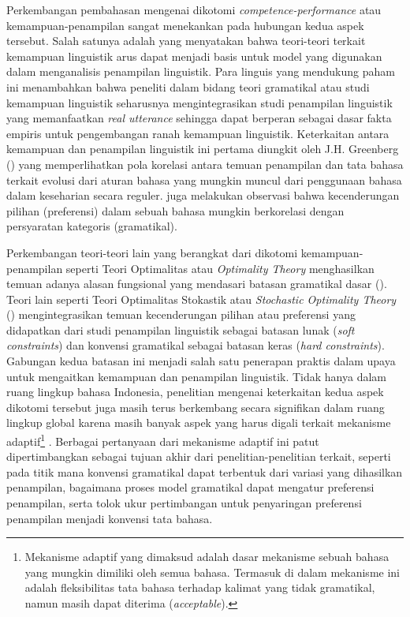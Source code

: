 Perkembangan pembahasan mengenai dikotomi \textit{competence-performance} atau kemampuan-penampilan sangat menekankan pada hubungan kedua aspek tersebut. Salah satunya adalah \cite{sagwasow2011pccg} yang menyatakan bahwa teori-teori terkait kemampuan linguistik arus dapat menjadi basis untuk model yang digunakan dalam menganalisis penampilan linguistik. Para linguis yang mendukung paham ini menambahkan bahwa peneliti dalam bidang teori gramatikal atau studi kemampuan linguistik seharusnya mengintegrasikan studi penampilan linguistik yang memanfaatkan \textit{real utterance} sehingga dapat berperan sebagai dasar fakta empiris untuk pengembangan ranah kemampuan linguistik. Keterkaitan antara kemampuan dan penampilan linguistik ini pertama diungkit oleh J.H. Greenberg (\citealp{greenberg1963some, greenberg1966language}) yang memperlihatkan pola korelasi antara temuan penampilan dan tata bahasa terkait evolusi dari aturan bahasa yang mungkin muncul dari penggunaan bahasa dalam keseharian secara reguler. \cite{givon1979syntax} juga melakukan observasi bahwa kecenderungan pilihan (preferensi) dalam sebuah bahasa mungkin berkorelasi dengan persyaratan kategoris (gramatikal). 

Perkembangan teori-teori lain yang berangkat dari dikotomi kemampuan-penampilan seperti Teori Optimalitas atau \textit{Optimality Theory} menghasilkan temuan adanya alasan fungsional yang mendasari batasan gramatikal dasar (\citealp{haspelmath1999optimality, aissen1999markedness}). Teori lain seperti Teori Optimalitas Stokastik atau \textit{Stochastic Optimality Theory} (\citealp{bresnan2001soft, manning2003probabilistic}) mengintegrasikan temuan kecenderungan pilihan atau preferensi yang didapatkan dari studi penampilan linguistik  sebagai batasan lunak (\textit{soft constraints}) dan konvensi gramatikal sebagai batasan keras (\textit{hard constraints}).  Gabungan kedua batasan ini menjadi salah satu penerapan praktis dalam upaya untuk mengaitkan kemampuan dan penampilan linguistik. Tidak hanya dalam ruang lingkup bahasa Indonesia, penelitian mengenai keterkaitan kedua aspek dikotomi tersebut juga masih terus berkembang secara signifikan dalam ruang lingkup global karena masih banyak aspek yang harus digali terkait mekanisme adaptif\footnote{Mekanisme adaptif yang dimaksud adalah dasar mekanisme sebuah bahasa yang mungkin dimiliki oleh semua bahasa. Termasuk di dalam mekanisme ini adalah fleksibilitas tata bahasa terhadap kalimat yang tidak gramatikal, namun masih dapat diterima (\textit{acceptable}).} \citep{kirby1999function}. Berbagai pertanyaan dari mekanisme adaptif ini patut dipertimbangkan sebagai tujuan akhir dari penelitian-penelitian terkait, seperti pada titik mana konvensi gramatikal dapat terbentuk dari variasi yang dihasilkan penampilan, bagaimana proses model gramatikal dapat mengatur preferensi penampilan, serta tolok ukur pertimbangan untuk penyaringan preferensi penampilan menjadi konvensi tata bahasa.


